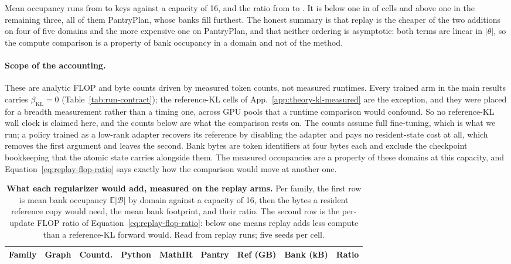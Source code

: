 \documentclass{article}
\newcommand{\1}{\mathbf 1}
\newcommand{\E}{\mathbb E}
\theoremstyle{remark}
\theoremstyle{definition}
\theoremstyle{plain}
\begin{document}
Mean occupancy runs from \MDcostOccMin{} to \MDcostOccMax{} keys against a
capacity of 16, and the ratio from \MDcostRatioMin{} to \MDcostRatioMax{}.
It is below one in \MDcostCellsBelow{} of \MDcostCellsTotal{} cells and above
one in the remaining three, all of them PantryPlan, whose banks fill furthest.
The honest summary is that replay is the cheaper of the two additions on four
of five domains and the more expensive one on PantryPlan, and that neither
ordering is asymptotic: both terms are linear in $|\theta|$, so the compute
comparison is a property of bank occupancy in a domain and not of the method.

\paragraph{Scope of the accounting.}
These are analytic FLOP and byte counts driven by measured token counts, not
measured runtimes. Every trained arm in the main results carries
$\beta_{\mathrm{KL}}=0$ (Table~\ref{tab:run-contract}); the reference-KL cells
of App.~\ref{app:theory-kl-measured} are the exception, and they were placed
for a breadth measurement rather than a timing one, across GPU pools that a
runtime comparison would confound. So no reference-KL wall clock is claimed
here, and the counts below are what the comparison rests on. The counts assume full
fine-tuning, which is what we run; a policy trained as a low-rank adapter
recovers its reference by disabling the adapter and pays no resident-state cost
at all, which removes the first argument and leaves the second. Bank bytes are
token identifiers at four bytes each and exclude the checkpoint bookkeeping
that the atomic state carries alongside them. The measured occupancies are a
property of these domains at this capacity, and
Equation~\eqref{eq:replay-flop-ratio} says exactly how the comparison would
move at another one.

\begin{table}[t]
  \centering
  \caption{\textbf{What each regularizer would add, measured on the replay
  arms.} Per family, the first row is mean bank occupancy $\E|\mathcal B|$ by
  domain against a capacity of 16, then the bytes a resident reference copy
  would need, the mean bank footprint, and their ratio. The second row is the
  per-update FLOP ratio of Equation~\eqref{eq:replay-flop-ratio}: below one
  means replay adds less compute than a reference-KL forward would. Read from
  \MDcostRuns{} replay runs; five seeds per cell.}
  \label{tab:replay-cost}
  \scriptsize
  \setlength{\tabcolsep}{4.2pt}
  \begin{tabular}{@{}lrrrrrrrr@{}}
    \toprule
    \textbf{Family} & \textbf{Graph} & \textbf{Countd.} & \textbf{Python}
      & \textbf{MathIR} & \textbf{Pantry} & \textbf{Ref (GB)}
      & \textbf{Bank (kB)} & \textbf{Ratio} \\
    \midrule
    
  \end{tabular}
\end{table}
\end{document}
